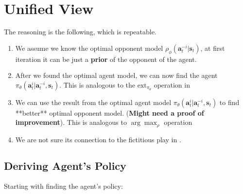 \section{Unified View}

\noindent
The reasoning is the following, which is repeatable.
\begin{enumerate}
    \item We assume we know the optimal opponent model $\rho_{\phi}(\boldsymbol{a}^{-i}_t | \boldsymbol{s}_t)$, at first iteration it can be just a \textbf{prior} of the opponent of the agent.  
    \item After we found the optimal agent model, we can now find the agent  $\pi_{\theta}(\boldsymbol{a}^i_t | \boldsymbol{a}^{-i}_t, \boldsymbol{s}_t)$. This is analogous to the $\text{ext}_{\pi_{\theta}}$ operation in \cite{grau2018balancing}
    \item We can use the result from the optimal agent model $\pi_{\theta}(\boldsymbol{a}^i_t | \boldsymbol{a}^{-i}_t, \boldsymbol{s}_t)$ to find **better** optimal opponent model. (\textbf{Might need a proof of improvement}). This is analogous to $\arg\max_{\rho}$ operation
    \item We are not sure its connection to the fictitious play in \cite{1591992}. 
\end{enumerate}

\subsection{Deriving Agent's Policy}
Starting with finding the agent's policy: 

